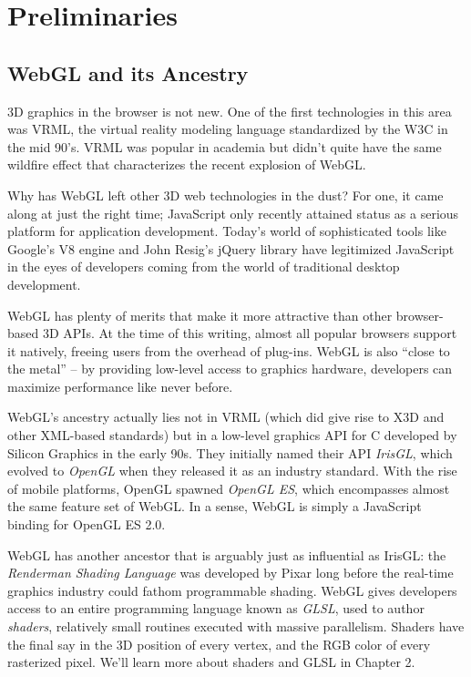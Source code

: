 \chapter{Preliminaries}

\section{WebGL and its Ancestry}

3D graphics in the browser is not new.  One of the first technologies in this area was  VRML, the virtual reality modeling language standardized by the W3C in the mid 90's.  VRML was popular in academia but didn't quite have the same wildfire effect that characterizes the recent explosion of WebGL.

Why has WebGL left other 3D web technologies in the dust?  For one, it came along at just the right time; JavaScript only recently attained status as a serious platform for application development.  Today's world of sophisticated tools like Google's V8  engine  and John Resig's jQuery  library have legitimized JavaScript in the eyes of developers coming from the world of traditional desktop development.

WebGL has plenty of merits that make it more attractive than other browser-based 3D APIs.  At the time of this writing, almost all popular browsers support it natively, freeing users from the overhead of plug-ins.  WebGL is also ``close to the metal'' -- by providing low-level access to graphics hardware, developers can maximize performance like never before.

WebGL's ancestry actually lies not in VRML (which did give rise to X3D and other XML-based standards) but in a low-level graphics API for C developed by Silicon Graphics in the early 90s.  They initially named their API \emph{IrisGL}, which evolved to \emph{OpenGL} when they released it as an industry standard.   With the rise of mobile platforms, OpenGL spawned \emph{OpenGL ES}, which encompasses almost the same feature set of WebGL.  In a sense, WebGL is simply a JavaScript binding for OpenGL ES 2.0.

WebGL has another ancestor that is arguably just as influential as IrisGL: the \emph{Renderman Shading Language} was developed by Pixar long before the real-time graphics industry could fathom programmable shading.  WebGL gives developers access to an entire programming language known as  \emph{GLSL}, used to author  \emph{shaders}, relatively small routines executed with massive parallelism.  Shaders have the final say in the 3D position of every vertex, and the RGB color of every rasterized pixel.  We'll learn more about shaders and GLSL in Chapter 2.

